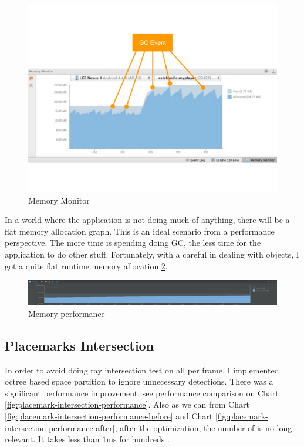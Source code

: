 \begin{figure}[H]
	\caption[Memory monitor]{Memory Monitor \cite{google.memory-monitor.2015}}
	\label{fig:memory-monitor}
	\centering
	\includegraphics[width=\textwidth, keepaspectratio]{Figures/memory-monitor.png}
	\decoRule
\end{figure}

In a world where the application is not doing much of anything, there will be a flat memory allocation graph. This is an ideal scenario from a performance perspective. The more time is spending doing GC, the less time for the application to do other stuff. Fortunately, with a careful in dealing with objects, I got a quite flat runtime memory allocation \ref{fig:memory-performance}.

\begin{figure}[H]
	\caption{Memory performance}
	\label{fig:memory-performance}
	\centering
	\includegraphics[width=\textwidth, keepaspectratio]{Figures/memory-performance.png}
	\decoRule
\end{figure}

\subsection{Placemarks Intersection}
\label{section:placemarks-intersection}

In order to avoid doing ray intersection test on all  per frame, I implemented octree based space partition to ignore unnecessary detections. There was a significant performance improvement, see performance comparison on Chart \ref{fig:placemark-intersection-performance}. Also as we can from Chart \ref{fig:placemark-intersection-performance-before} and Chart \ref{fig:placemark-intersection-performance-after}, after the optimization, the number of  is no long relevant. It takes less than $1$ms for hundreds .

